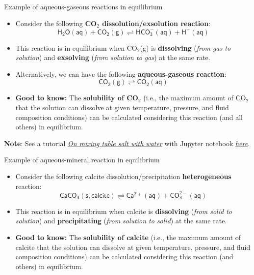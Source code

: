 \begin{frame}{Example of aqueous-gaseous reactions in equilibrium}
	\begin{itemize}
		\item Consider the following \alert{\bf CO$_{2}$ dissolution/exsolution reaction}:
	\[
	\mathsf{H_2O(aq) + CO_{2}(g) \rightleftharpoons HCO^-_3(aq) + H^+(aq)}
	\]
\vskip -10pt
\pause
\item This reaction is in equilibrium when CO$_{2}$(g) is \textbf{dissolving
}(\emph{from gas to solution}) and \textbf{exsolving} (\emph{from
solution to gas}) at the same rate. 
	\pause
\item Alternatively, we can have the following \alert{\bf aqueous-gaseous reaction}:
%
\[
\mathsf{CO_{2}(g) \rightleftharpoons CO_2(aq)}
\]
\vskip -10pt
%
	\pause
\item \alert{\textbf{Good to know:}} The \textbf{solubility of
CO$_{2}$} (i.e., the maximum amount of CO$_{2}$ that the solution
can dissolve at given temperature, pressure, and fluid composition
conditions) can be calculated considering this reaction (and all others)
in equilibrium.
\end{itemize}
%
	\pause
\alert{\textbf{Note}}: See a tutorial \href{https://reaktoro.org/applications/miscellaneous/opening-bottle-with-sparkling-water.html}{\textcolor{indigo(dye)}{\it On mixing table salt with water}} with Jupyter notebook \href{https://github.com/mtsveta/reaktoro-v2-workshop/blob/main/tutorials/applications/opening-bottel-with-soda.ipynb}{\textcolor{indigo(dye)}{\it here}}.
%
\end{frame}
%
%
\begin{frame}[<+->]{Example of aqueous-mineral reaction in equilibrium}
\begin{itemize}
\item Consider the following calcite dissolution/precipitation \textbf{heterogeneous} reaction:
\[
\mathrm{\mathsf{CaCO_{3}(s,calcite) \rightleftharpoons Ca^{2+}(aq)+CO_{3}^{2-}(aq)}}
\]
\item This reaction is in equilibrium when calcite is \textbf{dissolving
}(\emph{from solid to solution}) and \textbf{precipitating} (\emph{from
solution to solid}) at the same rate. 
\item \textbf{\alert{\textbf{Good to know:}}} The \textbf{solubility of
calcite} (i.e., the maximum amount of calcite that the solution can
dissolve at given temperature, pressure, and fluid composition conditions)
can be calculated considering this reaction (and others) in equilibrium.
\end{itemize}
\end{frame}

